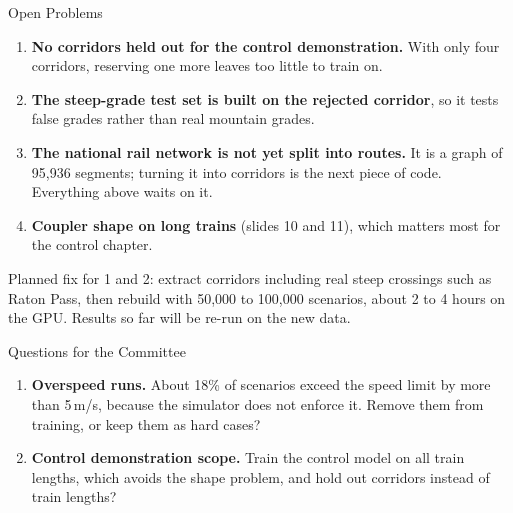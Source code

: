 \documentclass[aspectratio=169,11pt]{beamer}
\begin{document}
\begin{frame}{Open Problems}
  \vspace{0.4em}
  \begin{enumerate}\setlength\itemsep{0.7em}
    \small
    \item \textbf{No corridors held out for the control demonstration.} With
          only four corridors, reserving one more leaves too little to train on.
    \item \textbf{The steep-grade test set is built on the rejected corridor},
          so it tests false grades rather than real mountain grades.
    \item \textbf{The national rail network is not yet split into routes.} It is
          a graph of 95,936 segments; turning it into corridors is the next
          piece of code. Everything above waits on it.
    \item \textbf{Coupler shape on long trains} (slides 10 and 11), which matters
          most for the control chapter.
  \end{enumerate}

  \vspace{0.6em}
  \begin{minipage}{0.92\textwidth}\footnotesize\color{uniSlate}
    Planned fix for 1 and 2: extract corridors including real steep crossings
    such as Raton Pass, then rebuild with 50,000 to 100,000 scenarios, about
    2 to 4 hours on the GPU. Results so far will be re-run on the new data.
  \end{minipage}
\end{frame}

\begin{frame}{Questions for the Committee}
  \vspace{0.5em}
  \begin{enumerate}\setlength\itemsep{1.0em}
    \small
    \item \textbf{Overspeed runs.} About 18\% of scenarios exceed the speed
          limit by more than 5\,m/s, because the simulator does not enforce
          it. Remove them from training, or keep them as hard cases?
    \item \textbf{Control demonstration scope.} Train the control model on
          all train lengths, which avoids the shape problem, and hold out
          corridors instead of train lengths?
  \end{enumerate}
\end{frame}
\end{document}
